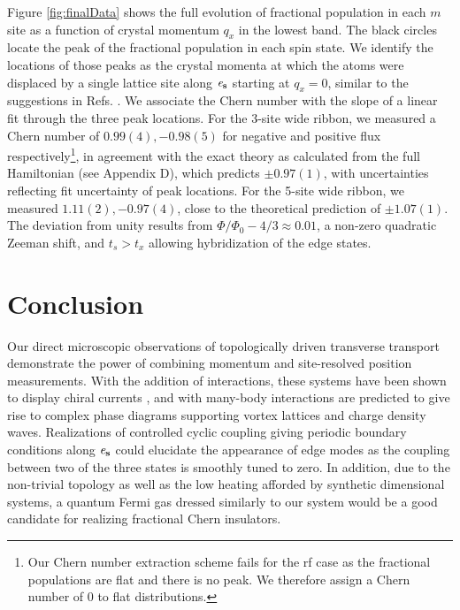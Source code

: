 	 Figure \ref{fig:finalData} shows the full evolution of fractional population in each $m$ site as a function of crystal momentum $q_x$ in the lowest band.  The black circles locate the peak of the fractional population in each spin state. We identify the locations of those peaks as the crystal momenta at which the atoms were displaced by a single lattice site along $\bf{\mathit{e}_s}$ starting at $q_x=0$, similar to the suggestions in Refs. \cite{Zhang2016,Mugel2017}. We associate the Chern number with the slope of a linear fit through the three peak locations.  For the 3-site wide ribbon, we measured a Chern number of $0.99(4), -0.98(5)$ for negative and positive flux respectively\footnote{Our Chern number extraction scheme fails for the rf case as the fractional populations are flat and there is no peak. We therefore assign a Chern number of $0$ to flat distributions.}, in agreement with the exact theory as calculated from the full Hamiltonian (see Appendix D), which predicts $\pm0.97(1)$, with uncertainties reflecting fit uncertainty of peak locations.  For the 5-site wide ribbon,  we measured $1.11(2), -0.97(4)$, close to the theoretical prediction of $\pm 1.07(1)$. The deviation from unity results from $\Phi/\Phi_0-4/3\approx0.01$, a non-zero quadratic Zeeman shift, and $t_s>t_x$ allowing hybridization of the edge states\cite{Mugel2017}.
	 
\section{Conclusion}
	
	Our direct microscopic observations of topologically driven transverse transport demonstrate the power of combining momentum and site-resolved position measurements. With the addition of interactions, these systems have been shown to display chiral currents \cite{Tai2017}, and with many-body interactions are predicted to give rise to complex phase diagrams supporting vortex lattices and charge density waves\cite{Greschner2015,Greschner2016,CalvaneseStrinati2017}. Realizations of controlled cyclic coupling giving periodic boundary conditions\cite{Celi2014} along $\bf{\mathit{e}_s}$ could elucidate the appearance of edge modes as the coupling between two of the three states is smoothly tuned to zero. In addition, due to the non-trivial topology as well as the low heating afforded by synthetic dimensional systems, a quantum Fermi gas dressed similarly to our system would be a good candidate for realizing fractional Chern insulators\cite{Parameswaran2013}.  

